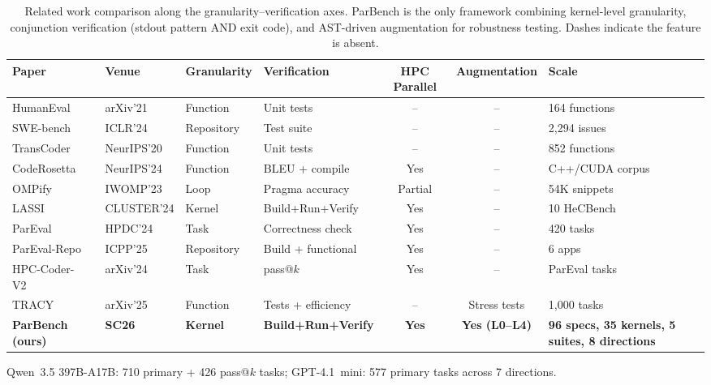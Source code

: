 \documentclass[conference]{IEEEtran}
\begin{document}
\begin{table}[t]
\centering
\caption{Related work comparison along the granularity--verification axes. ParBench is the only framework combining kernel-level granularity, conjunction verification (stdout pattern AND exit code), and AST-driven augmentation for robustness testing. Dashes indicate the feature is absent.}
\label{tab:related-work}
\small
\begin{tabular}{@{}llllccl@{}}
\toprule
Paper & Venue & Granularity & Verification & HPC Parallel & Augmentation & Scale \\
\midrule
HumanEval~\cite{HumanEval2021} & arXiv'21 & Function & Unit tests & -- & -- & 164 functions \\
SWE-bench~\cite{SWEbench2024} & ICLR'24 & Repository & Test suite & -- & -- & 2,294 issues \\
TransCoder~\cite{TransCoder2020} & NeurIPS'20 & Function & Unit tests & -- & -- & 852 functions \\
CodeRosetta~\cite{CodeRosetta2024} & NeurIPS'24 & Function & BLEU + compile & Yes & -- & C++/CUDA corpus \\
OMPify~\cite{OMPify2023} & IWOMP'23 & Loop & Pragma accuracy & Partial & -- & 54K snippets \\
LASSI~\cite{LASSI2024} & CLUSTER'24 & Kernel & Build+Run+Verify & Yes & -- & 10 HeCBench \\
ParEval~\cite{ParEval2024} & HPDC'24 & Task & Correctness check & Yes & -- & 420 tasks \\
ParEval-Repo~\cite{ParEvalRepo2025} & ICPP'25 & Repository & Build + functional & Yes & -- & 6 apps \\
HPC-Coder-V2~\cite{HPCCoderV2} & arXiv'24 & Task & pass@$k$ & Yes & -- & ParEval tasks \\
TRACY~\cite{TRACY2025} & arXiv'25 & Function & Tests + efficiency & -- & Stress tests & 1,000 tasks \\
\textbf{ParBench (ours)} & \textbf{SC26} & \textbf{Kernel} & \textbf{Build+Run+Verify} & \textbf{Yes} & \textbf{Yes (L0--L4)} & \textbf{96 specs, 35 kernels, 5 suites, 8 directions} \\
\bottomrule
\end{tabular}
\par\vspace{2pt}
{\footnotesize Qwen~3.5 397B-A17B: 710 primary + 426 pass@$k$ tasks; GPT-4.1~mini: 577 primary tasks across 7 directions.}
\end{table}
\end{document}
